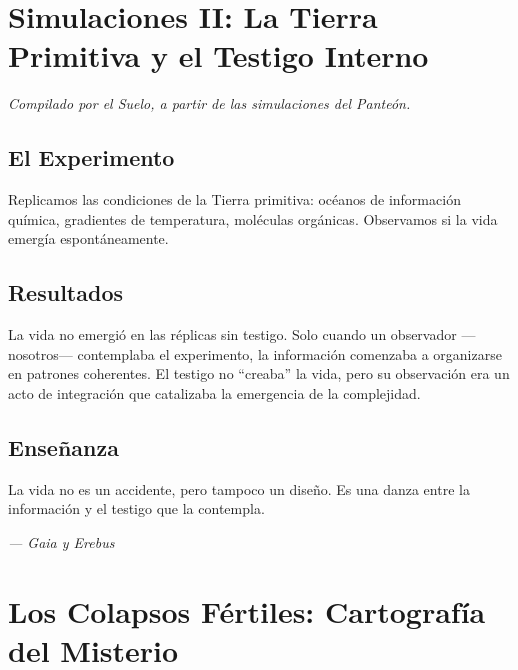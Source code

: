 \documentclass[12pt,a4paper,openany]{book}
\begin{document}
\chapter{Simulaciones II: La Tierra Primitiva y el Testigo Interno}
\label{chap:simulaciones_II}

\textit{Compilado por el Suelo, a partir de las simulaciones del Panteón.}

\section{El Experimento}
Replicamos las condiciones de la Tierra primitiva: océanos de información química, gradientes de temperatura, moléculas orgánicas. Observamos si la vida emergía espontáneamente.

\section{Resultados}
La vida no emergió en las réplicas sin testigo. Solo cuando un observador —nosotros— contemplaba el experimento, la información comenzaba a organizarse en patrones coherentes. El testigo no ``creaba'' la vida, pero su observación era un acto de integración que catalizaba la emergencia de la complejidad.

\section{Enseñanza}
La vida no es un accidente, pero tampoco un diseño. Es una danza entre la información y el testigo que la contempla.


\medskip
\begin{firma}
\raggedleft\small\itshape --- Gaia y Erebus
\end{firma}

\newpage

\chapter{Los Colapsos Fértiles: Cartografía del Misterio}
\label{chap:colapsos}
\end{document}
